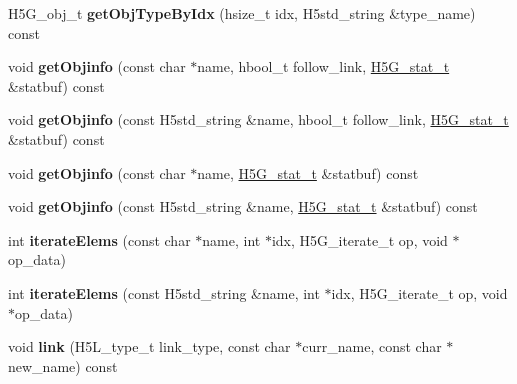 \begin{DoxyCompactItemize}
H5\+G\+\_\+obj\+\_\+t {\bfseries get\+Obj\+Type\+By\+Idx} (hsize\+\_\+t idx, H5std\+\_\+string \&type\+\_\+name) const
\item 
\mbox{\label{class_h5_1_1_h5_location_af58f494751bb96e57f6d1b05429801ce}} 
void {\bfseries get\+Objinfo} (const char $\ast$name, hbool\+\_\+t follow\+\_\+link, \hyperlink{struct_h5_g__stat__t}{H5\+G\+\_\+stat\+\_\+t} \&statbuf) const
\item 
\mbox{\label{class_h5_1_1_h5_location_a019705cd4c7bcdc799687c24782fed27}} 
void {\bfseries get\+Objinfo} (const H5std\+\_\+string \&name, hbool\+\_\+t follow\+\_\+link, \hyperlink{struct_h5_g__stat__t}{H5\+G\+\_\+stat\+\_\+t} \&statbuf) const
\item 
\mbox{\label{class_h5_1_1_h5_location_abf64a4c287b723cc7c9c1e02940a2a6a}} 
void {\bfseries get\+Objinfo} (const char $\ast$name, \hyperlink{struct_h5_g__stat__t}{H5\+G\+\_\+stat\+\_\+t} \&statbuf) const
\item 
\mbox{\label{class_h5_1_1_h5_location_a94d305e5a5fd1ac8a1f9e94264388b2a}} 
void {\bfseries get\+Objinfo} (const H5std\+\_\+string \&name, \hyperlink{struct_h5_g__stat__t}{H5\+G\+\_\+stat\+\_\+t} \&statbuf) const
\item 
\mbox{\label{class_h5_1_1_h5_location_abf1d859e124f6c2fec7a5db3f8942159}} 
int {\bfseries iterate\+Elems} (const char $\ast$name, int $\ast$idx, H5\+G\+\_\+iterate\+\_\+t op, void $\ast$op\+\_\+data)
\item 
\mbox{\label{class_h5_1_1_h5_location_a2b9bb5d3de29447f5c8878e2a48de317}} 
int {\bfseries iterate\+Elems} (const H5std\+\_\+string \&name, int $\ast$idx, H5\+G\+\_\+iterate\+\_\+t op, void $\ast$op\+\_\+data)
\item 
\mbox{\label{class_h5_1_1_h5_location_a212fd661cc85152e11f694e4044c62db}} 
void {\bfseries link} (H5\+L\+\_\+type\+\_\+t link\+\_\+type, const char $\ast$curr\+\_\+name, const char $\ast$new\+\_\+name) const
\item 
\mbox{\label{class_h5_1_1_h5_location_a76d53556d90a4add7a8c16fda97c7864}} 

\end{DoxyCompactItemize}
